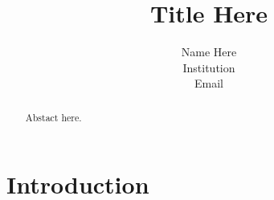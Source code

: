 \documentclass{article} %
\title{Title Here}
\author{Name Here \\
				Institution \\
				Email 
				}
\begin{document}

\maketitle	%

\begin{abstract} %
Abstact here.
\end{abstract}

\newpage	%

\section{Introduction} %

\end{document}

